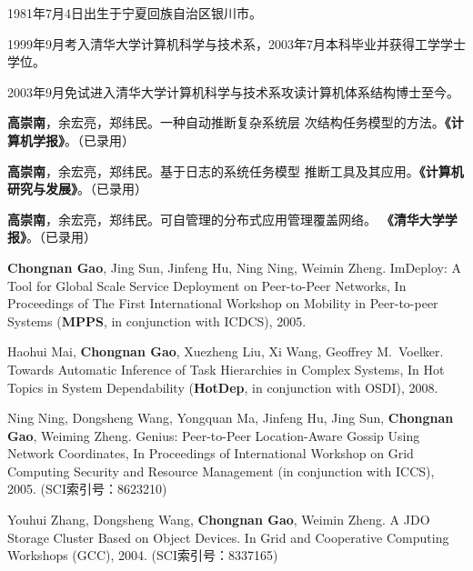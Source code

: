 \begin{resume}


  1981年7月4日出生于宁夏回族自治区银川市。

  1999年9月考入清华大学计算机科学与技术系，2003年7月本科毕业并获得工学学士学位。

  2003年9月免试进入清华大学计算机科学与技术系攻读计算机体系结构博士至今。


  \begin{enumerate}[{[}1{]}]

  \item \textbf{高崇南}，余宏亮，郑纬民。一种自动推断复杂系统层
  次结构任务模型的方法。\textbf{《计算机学报》}。（已录用）

  \item \textbf{高崇南}，余宏亮，郑纬民。基于日志的系统任务模型
  推断工具及其应用。\textbf{《计算机研究与发展》}。（已录用）

  \item \textbf{高崇南}，余宏亮，郑纬民。可自管理的分布式应用管理覆盖网络。
  \textbf{《清华大学学报》}。（已录用）

  \item \textbf{Chongnan Gao}, Jing Sun, Jinfeng Hu, Ning Ning,
  Weimin Zheng.  ImDeploy: A Tool for Global Scale Service
  Deployment on Peer-to-Peer Networks, In Proceedings of The
  First International Workshop on Mobility in Peer-to-peer
  Systems (\textbf{MPPS}, in conjunction with ICDCS), 2005.

  \item Haohui Mai, \textbf{Chongnan Gao}, Xuezheng Liu, Xi
  Wang, Geoffrey M.\ Voelker. Towards Automatic Inference of
  Task Hierarchies in Complex Systems, In Hot Topics in System
  Dependability (\textbf{HotDep}, in conjunction with OSDI),
  2008.

  \item Ning Ning, Dongsheng Wang, Yongquan Ma, Jinfeng Hu, Jing Sun,
  \textbf{Chongnan Gao}, Weiming Zheng. Genius: Peer-to-Peer Location-Aware
  Gossip Using Network Coordinates, In Proceedings of International Workshop
  on Grid Computing Security and Resource Management (in conjunction with
  ICCS), 2005. (SCI索引号：8623210)

  \item Youhui Zhang, Dongsheng Wang, \textbf{Chongnan Gao}, Weimin Zheng. A
  JDO Storage Cluster Based on Object Devices. In Grid and Cooperative
  Computing Workshops (GCC), 2004. (SCI索引号：8337165)


\end{enumerate}
\end{resume}
